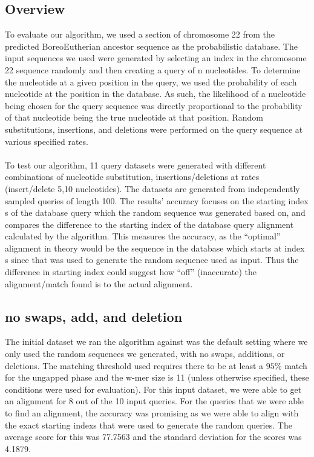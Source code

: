 \documentclass{article}
\begin{document}
\subsection*{Overview}
To evaluate our algorithm, we used a section of chromosome 22 from the predicted BoreoEutherian ancestor sequence as the probabilistic database. The input sequences we used were generated by selecting an index in the chromosome 22 sequence randomly and then creating a query of n nucleotides. To determine the nucleotide at a given position in the query, we used the probability of each nucleotide at the position in the database. As such, the likelihood of a nucleotide being chosen for the query sequence was directly proportional to the probability of that nucleotide being the true nucleotide at that position. Random substitutions, insertions, and deletions were performed on the query sequence at various specified rates. \\
\\
To test our algorithm, 11 query datasets were generated with different combinations of nucleotide substitution, insertions/deletions at rates (insert/delete 5,10 nucleotides). The datasets are generated from independently sampled queries of length 100. The results’ accuracy focuses on the starting index s of the database query which the random sequence was generated based on, and compares the difference to the starting index of the database query alignment calculated by the algorithm. This measures the accuracy, as the “optimal” alignment in theory would be the sequence in the database which starts at index s since that was used to generate the random sequence used as input. Thus the difference in starting index could suggest how “off” (inaccurate) the alignment/match found is to the actual alignment.\\

\subsection*{no swaps, add, and deletion}
The initial dataset we ran the algorithm against was the default setting where we only used the random sequences we generated, with no swaps, additions, or deletions. The matching threshold used requires there to be at least a $95\%$ match for the ungapped phase and the w-mer size is 11 (unless otherwise specified, these conditions were used for evaluation). For this input dataset, we were able to get an alignment for 8 out of the 10 input queries. For the queries that we were able to find an alignment, the accuracy was promising as we were able to align with the exact starting indexs that were used to generate the random queries. The average score for this was 77.7563 and the standard deviation for the scores was 4.1879.\\
\end{document}
